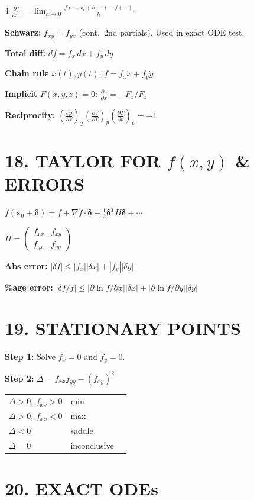 \documentclass[8pt,a4paper,landscape]{extarticle}
\newcommand{\pf}[2]{\frac{\partial #1}{\partial #2}}
\newcommand{\dx}{\,dx}
\begin{document}
\begin{multicols}{4}
$\pf{f}{x_i}=\lim_{h\to0}\frac{f(\ldots,x_i+h,\ldots)-f(\ldots)}{h}$

\textbf{Schwarz:} $f_{xy}=f_{yx}$ (cont.\ 2nd partials). Used in exact ODE test.

\textbf{Total diff:} $df=f_x\dx+f_y\,dy$

\textbf{Chain rule} $x(t),y(t)$: $\dot f=f_x\dot x+f_y\dot y$

\textbf{Implicit} $F(x,y,z)=0$: $\pf{z}{x}=-F_x/F_z$

\textbf{Reciprocity:} $\left(\pf{p}{V}\right)_T\!\left(\pf{V}{T}\right)_p\!\left(\pf{T}{p}\right)_V=-1$

\section*{18. TAYLOR FOR $f(x,y)$ \& ERRORS}

$f(\mathbf{x}_0+\boldsymbol\delta)=f+\nabla f\cdot\boldsymbol\delta+\tfrac12\boldsymbol\delta^T H\boldsymbol\delta+\cdots$

$H=\begin{pmatrix}f_{xx}&f_{xy}\\f_{yx}&f_{yy}\end{pmatrix}$

\textbf{Abs error:} $|\delta f|\leq|f_x||\delta x|+|f_y||\delta y|$

\textbf{\%age error:} $|\delta f/f|\leq|\partial\ln f/\partial x||\delta x|+|\partial\ln f/\partial y||\delta y|$

\section*{19. STATIONARY POINTS}

\textbf{Step 1:} Solve $f_x=0$ and $f_y=0$.

\textbf{Step 2:} $\Delta=f_{xx}f_{yy}-(f_{xy})^2$

\begin{tabular}{@{}lll@{}}
$\Delta>0$, $f_{xx}>0$ & min & \\
$\Delta>0$, $f_{xx}<0$ & max & \\
$\Delta<0$ & saddle & \\
$\Delta=0$ & inconclusive & \\
\end{tabular}

\section*{20. EXACT ODEs}


\end{multicols}
\end{document}
